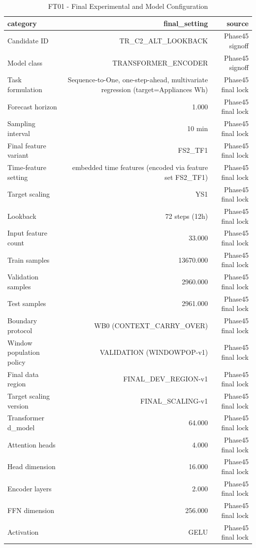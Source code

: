 \begin{table}[h!]
\centering
\caption{FT01 - Final Experimental and Model Configuration}
\label{tab:ft01\_-\_final\_experimental\_and\_model\_configuration}
\begin{tabular}{lrr}
\toprule
category & final\_setting & source \\
\midrule
Candidate ID & TR\_C2\_ALT\_LOOKBACK & Phase45 signoff \\
Model class & TRANSFORMER\_ENCODER & Phase45 signoff \\
Task formulation & Sequence-to-One, one-step-ahead, multivariate regression (target=Appliances Wh) & Phase45 final lock \\
Forecast horizon & 1.000 & Phase45 final lock \\
Sampling interval & 10 min & Phase45 final lock \\
Final feature variant & FS2\_TF1 & Phase45 final lock \\
Time-feature setting & embedded time features (encoded via feature set FS2\_TF1) & Phase45 final lock \\
Target scaling & YS1 & Phase45 final lock \\
Lookback & 72 steps (12h) & Phase45 final lock \\
Input feature count & 33.000 & Phase45 final lock \\
Train samples & 13670.000 & Phase45 final lock \\
Validation samples & 2960.000 & Phase45 final lock \\
Test samples & 2961.000 & Phase45 final lock \\
Boundary protocol & WB0 (CONTEXT\_CARRY\_OVER) & Phase45 final lock \\
Window population policy & VALIDATION (WINDOWPOP-v1) & Phase45 final lock \\
Final data region & FINAL\_DEV\_REGION-v1 & Phase45 final lock \\
Target scaling version & FINAL\_SCALING-v1 & Phase45 final lock \\
Transformer d\_model & 64.000 & Phase45 final lock \\
Attention heads & 4.000 & Phase45 final lock \\
Head dimension & 16.000 & Phase45 final lock \\
Encoder layers & 2.000 & Phase45 final lock \\
FFN dimension & 256.000 & Phase45 final lock \\
Activation & GELU & Phase45 final lock \\

\end{tabular}
\end{table}
